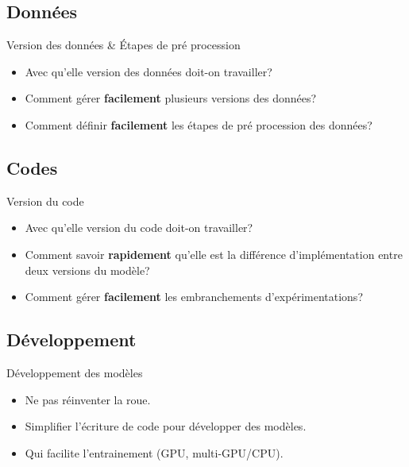 \documentclass[aspectratio=169,10pt,xcolor=x11names,english,french]{beamer}
\begin{document}
	\subsection{Données}
	\begin{frame}{Version des données \& Étapes de pré procession}
		\begin{itemize}
			\item<1-> Avec qu'elle version des données doit-on travailler?
			\item<2-> Comment gérer \textbf{facilement} plusieurs versions des données?
			\item<3-> Comment définir \textbf{facilement} les étapes de pré procession des données?
		\end{itemize}
	\end{frame}
	
	\subsection{Codes}
	\begin{frame}{Version du code}
		\begin{itemize}
			\item<1-> Avec qu'elle version du code doit-on travailler?
			\item<2-> Comment savoir \textbf{rapidement} qu'elle est la différence d'implémentation entre deux versions du modèle?
			\item<3-> Comment gérer \textbf{facilement} les embranchements d'expérimentations?
		\end{itemize}
	\end{frame}
	
	\subsection{Développement}
	\begin{frame}{Développement des modèles}
		\begin{itemize}
			\item<1-> Ne pas réinventer la roue.
			\item<2-> Simplifier l'écriture de code pour développer des modèles.
			\item<3-> Qui facilite l'entrainement (GPU, multi-GPU/CPU).
		\end{itemize}
	\end{frame}
	
\end{document}
